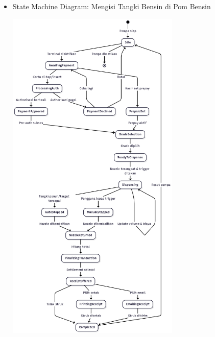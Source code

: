\documentclass[a4paper]{article}
\begin{document}
\begin{enumerate}[itemsep=1em]
  \pagebreak

  \begin{itemize}[itemsep=1em]
    \item State Machine Diagram: Mengisi Tangki Bensin di Pom Bensin
    \begin{center}
      \includegraphics[width=0.65\textwidth,keepaspectratio]{fueling-state-diagram.png}
    \end{center}
  \end{itemize}

  \pagebreak


\end{enumerate}
\end{document}
